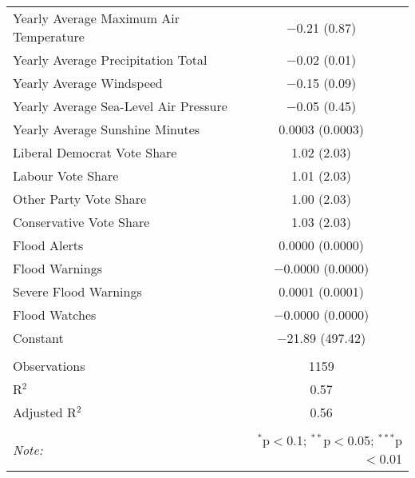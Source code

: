 \documentclass[12pt,letterpaper]{article}
\begin{document}
\begin{table}[!htbp]
\begin{tabular}{@{\extracolsep{5pt}}lc}
		Yearly Average Maximum Air Temperature & $-$0.21 (0.87) \\ 
		Yearly Average Precipitation Total & $-$0.02 (0.01) \\ 
		Yearly Average Windspeed & $-$0.15 (0.09) \\ 
		Yearly Average  Sea-Level Air Pressure & $-$0.05 (0.45) \\ 
		Yearly Average Sunshine Minutes & 0.0003 (0.0003) \\ 
		Liberal Democrat Vote Share & 1.02 (2.03) \\ 
		Labour Vote Share & 1.01 (2.03) \\ 
		Other Party Vote Share & 1.00 (2.03) \\ 
		Conservative Vote Share & 1.03 (2.03) \\ 
		Flood Alerts & 0.0000 (0.0000) \\ 
		Flood Warnings & $-$0.0000 (0.0000) \\ 
		Severe Flood Warnings & 0.0001 (0.0001) \\ 
		Flood Watches & $-$0.0000 (0.0000) \\ 
		Constant & $-$21.89 (497.42) \\ 
		\hline \\[-1.8ex] 
		Observations & 1159 \\ 
		R$^{2}$ & 0.57 \\ 
		Adjusted R$^{2}$ & 0.56 \\ 
		\hline 
		\hline \\[-1.8ex] 
		\textit{Note:}  & \multicolumn{1}{r}{$^{*}$p$<$0.1; $^{**}$p$<$0.05; $^{***}$p$<$0.01} \\ 
	\end{tabular} 
\end{table} 








\newpage
\end{document}

